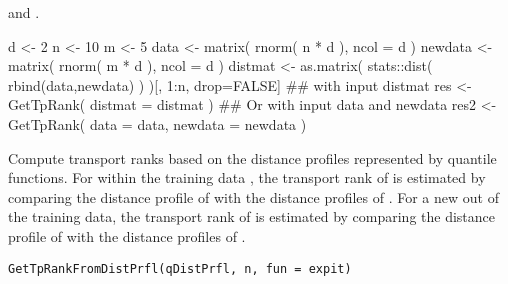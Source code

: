 \documentclass[a4paper]{book}
\begin{document}
%
\begin{SeeAlso}\relax
{} and .
\end{SeeAlso}
%
\begin{Examples}
\begin{ExampleCode}
d <- 2
n <- 10
m <- 5
data <- matrix( rnorm( n * d ), ncol = d )
newdata <- matrix( rnorm( m * d ), ncol = d )
distmat <- as.matrix( stats::dist( rbind(data,newdata) ) )[, 1:n, drop=FALSE]
## with input distmat
res <- GetTpRank( distmat = distmat )
## Or with input data and newdata
res2 <- GetTpRank( data = data, newdata = newdata )
\end{ExampleCode}
\end{Examples}
%
\begin{Description}\relax
Compute transport ranks based on the distance profiles represented by quantile functions. 
For  within the training data , 
the transport rank of  is estimated by comparing the distance profile of  with 
the distance profiles of .
For a new  out of the training data, 
the transport rank of  is estimated by comparing the distance profile of  with 
the distance profiles of .
\end{Description}
%
\begin{Usage}
\begin{verbatim}
GetTpRankFromDistPrfl(qDistPrfl, n, fun = expit)
\end{verbatim}
\end{Usage}
%
\end{document}
